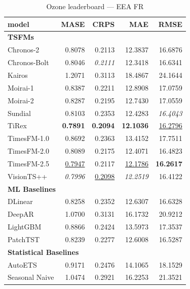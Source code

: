 \begin{table}[H]
\caption{Ozone leaderboard --- EEA FR}
\centering
\begin{small}
\begin{tabular}{lrrrr}
\toprule
model & MASE & CRPS & MAE & RMSE \\
\midrule
\multicolumn{5}{l}{\textbf{TSFMs}} \\
Chronos-2 & 0.8078 & 0.2113 & 12.3837 & 16.6876 \\
Chronos-Bolt & 0.8046 & \textit{0.2111} & 12.3418 & 16.6341 \\
Kairos & 1.2071 & 0.3113 & 18.4867 & 24.1644 \\
Moirai-1 & 0.8387 & 0.2211 & 12.8908 & 17.0759 \\
Moirai-2 & 0.8287 & 0.2195 & 12.7430 & 17.0559 \\
Sundial & 0.8103 & 0.2353 & 12.4283 & \textit{16.4043} \\
TiRex & \textbf{0.7891} & \textbf{0.2094} & \textbf{12.1036} & \underline{16.2796} \\
TimesFM-1.0 & 0.8692 & 0.2363 & 13.4152 & 17.7511 \\
TimesFM-2.0 & 0.8089 & 0.2175 & 12.4071 & 16.4823 \\
TimesFM-2.5 & \underline{0.7947} & 0.2117 & \underline{12.1786} & \textbf{16.2617} \\
VisionTS++ & \textit{0.7996} & \underline{0.2098} & \textit{12.2519} & 16.4122 \\
\midrule
\multicolumn{5}{l}{\textbf{ML Baselines}} \\
DLinear & 0.8258 & 0.2352 & 12.6307 & 16.6328 \\
DeepAR & 1.0700 & 0.3131 & 16.1732 & 20.9212 \\
LightGBM & 0.8866 & 0.2424 & 13.5973 & 17.3537 \\
PatchTST & 0.8239 & 0.2277 & 12.6008 & 16.5287 \\
\midrule
\multicolumn{5}{l}{\textbf{Statistical Baselines}} \\
AutoETS & 0.9171 & 0.2476 & 14.1065 & 18.1529 \\
Seasonal Naive & 1.0474 & 0.2921 & 16.2253 & 21.3521 \\
\bottomrule
\end{tabular}
\end{small}
\end{table}